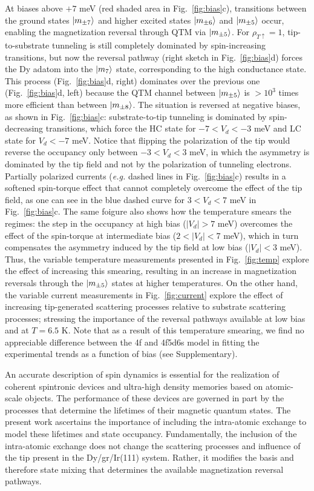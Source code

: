 \documentclass[
reprint,amsmath,amssymb,aps]{revtex4-2}
\begin{document}
At biases above $+7$ meV (red shaded area in Fig.~\ref{fig:bias}c), transitions between the ground states $\ket{m_{\pm7}}$ and higher excited states $\ket{m_{\pm 6}}$ and $\ket{m_{\pm 5}}$ occur, enabling the magnetization reversal through QTM via $\ket{m_{\pm 5}}$. For $\rho_{T \uparrow} = 1 $, tip-to-substrate tunneling is still completely dominated by spin-increasing transitions, but now the reversal pathway (right sketch in Fig.~\ref{fig:bias}d) forces the Dy adatom into the $\ket{m_{7}}$ state, corresponding to the high conductance state. This process (Fig.~\ref{fig:bias}d, right) dominates over the previous one (Fig.~\ref{fig:bias}d, left) because the QTM channel between $\ket{m_{\pm 5}}$ is $>10^3$ times more efficient than between $\ket{m_{\pm 8}}$. 
The situation is reversed at negative biases, as shown in Fig.~\ref{fig:bias}c: substrate-to-tip tunneling is dominated by spin-decreasing transitions, which force the HC state for $-7<V_d<-3$ meV and LC state for $V_d<-7$ meV. Notice that flipping the polarization of the tip would reverse the occupancy only between $-3<V_d<3$ meV, in which the asymmetry is dominated by the tip field and not by the polarization of tunneling electrons. Partially polarized currents (\textit{e.g.} dashed lines in Fig.~\ref{fig:bias}c) results in a softened spin-torque effect that cannot completely overcome the effect of the tip field, as one can see in the blue dashed curve for $3<V_d<7$ meV in Fig.~\ref{fig:bias}c.  The same foigure also shows how the temperature smears the regimes: the step in the occupancy at high bias ($|V_d|>7$ meV) overcomes the effect of the spin-torque at intermediate bias ($2<|V_d|<7$ meV), which in turn compensates the asymmetry induced by the tip field at low bias ($|V_d|<3$ meV). Thus, the variable temperature measurements presented in Fig.~\ref{fig:temp} explore the effect of increasing this smearing, resulting in an increase in magnetization reversals through the $\ket{m_{\pm 5}}$ states at higher temperatures. On the other hand, the variable current measurements in Fig.~\ref{fig:current} explore the effect of increasing tip-generated scattering processes relative to substrate scattering processes; stressing the importance of the reversal pathways available at low bias and at $T=6.5$ K. Note that as a result of this temperature smearing, we find no appreciable difference between the 4f and 4f5d6s model in fitting the experimental trends as a function of bias (see Supplementary).

An accurate description of spin dynamics is essential for the realization of coherent spintronic devices and ultra-high density memories based on atomic-scale objects. The performance of these devices are governed in part by the processes that determine the lifetimes of their magnetic quantum states. The present work ascertains the importance of including the intra-atomic exchange to model these lifetimes and state occupancy. Fundamentally, the inclusion of the intra-atomic exchange does not change the scattering processes and influence of the tip present in the Dy/gr/Ir(111) system. Rather, it modifies the basis and therefore state mixing that determines the available magnetization reversal pathways.



\end{document}
